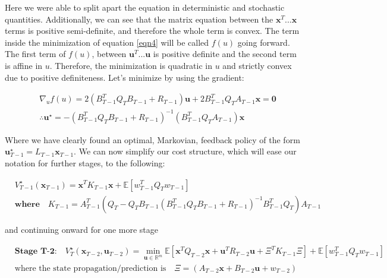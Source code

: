 \documentclass[conf]{new-aiaa}
\begin{document}
\begin{doublespace}
Here we were able to split apart the equation in deterministic and stochastic quantities. Additionally, we can see that the matrix equation between the $\mathbf{x}^T...\mathbf{x}$ terms is positive semi-definite, and therefore the whole term is convex. The term inside the minimization of equation \ref{eqn4} will be called $f(u)$ going forward. The first term of $f(u)$, between  $\mathbf{u}^T...\mathbf{u}$ is positive definite and the second term is affine in $u$. Therefore, the minimization is quadratic in $u$ and strictly convex due to positive definiteness. Let's minimize by using the gradient:
\begin{singlespace}
\begin{align}
&\nabla_u f(u) = 2(B_{T-1}^TQ_TB_{T-1} + R_{T-1})\mathbf{u} + 2B_{T-1}^TQ_TA_{T-1}\mathbf{x} = \mathbf{0} \\
&\therefore \mathbf{u}^\star = -(B_{T-1}^TQ_TB_{T-1} + R_{T-1})^{-1}(B_{T-1}^TQ_TA_{T-1})\mathbf{x}
\end{align}
\end{singlespace}

Where we have clearly found an optimal, Markovian, feedback policy of the form $\mathbf{u}_{T-1}^\star = L_{T-1}\mathbf{x}_{T-1}$. We can now simplify our cost structure, which will ease our notation for further stages, to the following:
\begin{singlespace}
\begin{align}
& V_{T-1}^\star(\mathbf{x}_{T-1}) = \mathbf{x}^TK_{T-1}\mathbf{x} + \mathbb{E}\left[w_{T-1}^TQ_Tw_{T-1}\right]\\
& \textbf{where} \quad K_{T-1} = A_{T-1}^T (Q_T - Q_TB_{T-1}(B_{T-1}^TQ_TB_{T-1} + R_{T-1})^{-1}B_{T-1}^TQ_T)A_{T-1}
\end{align}
\end{singlespace}

and continuing onward for one more stage
\begin{singlespace}
\begin{align*}
&\textbf{Stage T-2:} \quad V_T^\star(\mathbf{x}_{T-2},\mathbf{u}_{T-2}) =  \min_{\mathbf{u} \in \mathbb{R}^m} \mathbb{E} \left[\mathbf{x}^TQ_{T-2}\mathbf{x} + \mathbf{u}^TR_{T-2}\mathbf{u} + \Xi^TK_{T-1}\Xi \right] + \mathbb{E} \left[ w_{T-1}^TQ_Tw_{T-1} \right]\\
& \text{where the state propagation/prediction is} \quad \Xi = (A_{T-2}\mathbf{x} + B_{T-2}\mathbf{u} + w_{T-2})
\end{align*}
\end{singlespace}


\end{doublespace}
\end{document}
